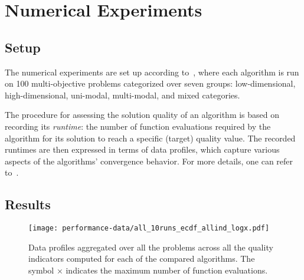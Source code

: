 \documentclass[conference]{IEEEtran}
\begin{document}



\section{Numerical Experiments}

\subsection{Setup}

The numerical experiments are set up according to~\cite{bmobench-16}, where each algorithm is run on 100 multi-objective problems categorized over seven groups: low-dimensional, high-dimensional, uni-modal, multi-modal, and mixed categories.

The procedure for assessing the solution quality of an algorithm is based on recording its \emph{runtime}: the number of function evaluations required by the algorithm for its solution to reach a specific (target) quality value. The recorded runtimes are then expressed in terms of data profiles, which capture various aspects of the algorithms' convergence behavior. For more details, one can refer to~\cite{bmobench-16}.

\subsection{Results}
\begin{figure}[tb]
	\centering
	\texttt{[image: performance-data/all\_10runs\_ecdf\_allind\_logx.pdf]}
	\caption{Data profiles aggregated over all the problems across all
		the quality indicators computed for each of the compared algorithms. The symbol × indicates the maximum number of function
		evaluations.
}
	\label{fig:all_ind}
\end{figure}
\end{document}

